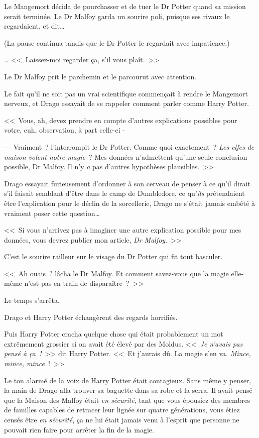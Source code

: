 Le Mangemort décida de pourchasser et de tuer le Dr Potter quand sa mission serait terminée. Le Dr Malfoy garda un sourire poli, puisque ses rivaux le regardaient, et dit…

(La pause continua tandis que le Dr Potter le regardait avec impatience.)

… <<~Laissez-moi regarder ça, s'il vous plaît.~>>

Le Dr Malfoy prit le parchemin et le parcourut avec attention.

Le fait qu'il ne soit pas un vrai scientifique commençait à rendre le Mangemort nerveux, et Drago essayait de se rappeler comment parler comme Harry Potter.

<<~Vous, ah, devez prendre en compte d'autres explications possibles pour votre, euh, observation, à part celle-ci -

--- Vraiment~? l'interrompit le Dr Potter. Comme quoi exactement~? \emph{Les elfes de maison volent notre magie}~? Mes données n'admettent qu'une seule conclusion possible, Dr Malfoy. Il n'y \emph{a} pas d'autres hypothèses plausibles.~>>

Drago essayait furieusement d'ordonner à son cerveau de penser à ce qu'il dirait s'il faisait semblant d'être dans le camp de Dumbledore, ce qu'\emph{ils} prétendaient être l'explication pour le déclin de la sorcellerie, Drago ne s'était jamais embêté à vraiment poser cette question…

<<~Si vous n'arrivez pas à imaginer une autre explication possible pour mes données, vous devrez publier mon article, \emph{Dr Malfoy}.~>>

C'est le sourire railleur sur le visage du Dr Potter qui fit tout basculer.

<<~Ah ouais~? lâcha le Dr Malfoy. Et comment savez-vous que la magie elle-même n'est pas en train de disparaître~?~>>

Le temps s'arrêta.

Drago et Harry Potter échangèrent des regards horrifiés.

Puis Harry Potter cracha quelque chose qui était probablement un mot extrêmement grossier si on avait été élevé par des Moldus. <<~\emph{Je n'avais pas pensé à ça~!}~>> dit Harry Potter. <<~Et j'aurais dû. La magie s'en va. \emph{Mince, mince, mince}~!~>>

Le ton alarmé de la voix de Harry Potter était contagieux. Sans même y penser, la main de Drago alla trouver sa baguette dans sa robe et la serra. Il avait pensé que la Maison des Malfoy était \emph{en sécurité}, tant que vous épousiez des membres de familles capables de retracer leur lignée sur quatre générations, vous étiez censés être \emph{en sécurité}, ça ne lui était jamais venu à l'esprit que personne ne pouvait rien faire pour arrêter la fin de la magie.

